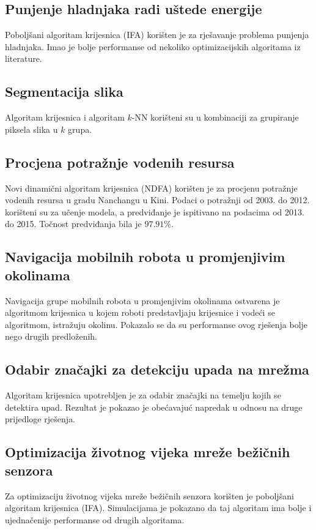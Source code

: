 \subsection{Punjenje hladnjaka radi uštede energije}
Poboljšani algoritam krijesnica (IFA) korišten je za rješavanje problema punjenja hladnjaka.\cite{COELHO2013273} Imao je bolje performanse od nekoliko optimizacijskih algoritama iz literature.

\subsection{Segmentacija slika}
Algoritam krijesnica i algoritam $k$-NN korišteni su u kombinaciji za grupiranje piksela slika u $k$ grupa.\cite{7857598}

\subsection{Procjena potražnje vodenih resursa}
Novi dinamični algoritam krijesnica (NDFA) korišten je za procjenu potražnje vodenih resursa u gradu Nanchangu u Kini.\cite{WANG201895} Podaci o potražnji od 2003. do 2012. korišteni su za učenje modela, a predviđanje je ispitivano na podacima  od 2013. do 2015. Točnost predviđanja bila je $97.91\%$.

\subsection{Navigacija mobilnih robota u promjenjivim okolinama}
Navigacija grupe mobilnih robota u promjenjivim okolinama ostvarena je algoritmom krijesnica u kojem roboti predstavljaju krijesnice i vodeći se algoritmom, istražuju okolinu.\cite{PATLE2018691} Pokazalo se da su performanse ovog rješenja bolje nego drugih predloženih.

\subsection{Odabir značajki za detekciju upada na mrežma}
Algoritam krijesnica upotrebljen je za odabir značajki na temelju kojih se detektira upad.\cite{B2019148} Rezultat je pokazao je obećavajuć napredak u odnosu na druge prijedloge rješenja.

\subsection{Optimizacija životnog vijeka mreže bežičnih senzora}
Za optimizaciju životnog vijeka mreže bežičnih senzora korišten je poboljšani algoritam krijesnica (IFA).\cite{9148087} Simulacijama je pokazano da taj algoritam ima bolje i ujednačenije performanse od drugih algoritama.
